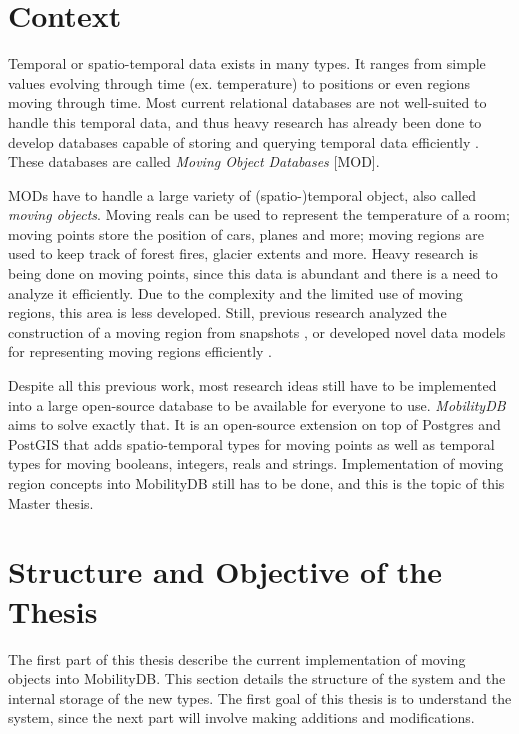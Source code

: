 \section{Context}

Temporal or spatio-temporal data exists in many types. It ranges from simple values evolving through time (ex. temperature) to positions or even regions moving through time. Most current relational databases are not well-suited to handle this temporal data, and thus heavy research has already been done to develop databases capable of storing and querying temporal data efficiently . These databases are called \textit{Moving Object Databases} [MOD].

MODs have to handle a large variety of (spatio-)temporal object, also called \textit{moving objects}. Moving reals can be used to represent the temperature of a room; moving points store the position of cars, planes and more; moving regions are used to keep track of forest fires, glacier extents and more. Heavy research is being done on moving points, since this data is abundant and there is a need to analyze it efficiently. Due to the complexity and the limited use of moving regions, this area is less developed. Still, previous research analyzed the construction of a moving region from snapshots , or developed novel data models for representing moving regions efficiently .

Despite all this previous work, most research ideas still have to be implemented into a large open-source database to be available for everyone to use. \textit{MobilityDB}  aims to solve exactly that. It is an open-source extension on top of Postgres  and PostGIS  that adds spatio-temporal types for moving points as well as temporal types for moving booleans, integers, reals and strings. Implementation of moving region concepts into MobilityDB still has to be done, and this is the topic of this Master thesis.

\section{Structure and Objective of the Thesis}

The first part of this thesis describe the current implementation of moving objects into MobilityDB. This section details the structure of the system and the internal storage of the new types. The first goal of this thesis is to understand the system, since the next part will involve making additions and modifications.

